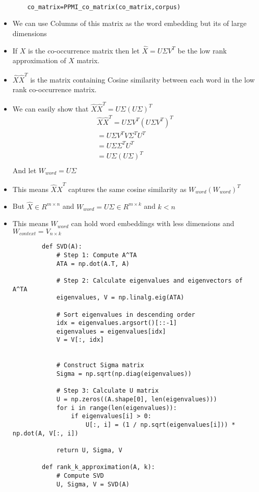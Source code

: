\documentclass{book}
\begin{document}
\begin{itemize}
\begin{verbatim}
	
	co_matrix=PPMI_co_matrix(co_matrix,corpus)
	\end{verbatim}
	\item We can use Columns of this matrix as the word embedding but its of large dimensions
	\item If $X$ is the co-occurrence matrix then let $\hat{X}=U\Sigma V^T$ be the low rank approximation of $X$ matrix.
	\item $\hat{X}\hat{X}^T$ is the matrix containing Cosine similarity between each word in the low rank co-occurrence matrix.
	\item We can easily show that $\hat{X}\hat{X}^T=U\Sigma(U\Sigma)^T$
	\subitem 
	\begin{align}
		\hat{X}\hat{X}^T=U\Sigma V^T(U\Sigma V^T)^T \nonumber\\
		= U\Sigma V^T V\Sigma^T U^T \nonumber\\
		= U\Sigma\Sigma^T U^T \nonumber\\
		= U\Sigma(U\Sigma)^T \nonumber\\
	\end{align}
	And let $W_{word}=U\Sigma$
	\item This means $\hat{X}\hat{X}^T$ captures the same cosine similarity as $W_{word}(W_{word})^T$
	\item But $\hat{X}\in R^{m\times n}$ and $W_{word}=U\Sigma \in R^{m\times k}$ and $k<n$
	\item This means $W_{word}$ can hold word embeddings with less dimensions and $W_{context}=V_{n\times k}$
	\subitem 
	\begin{verbatim}
		def SVD(A):
			# Step 1: Compute A^TA
			ATA = np.dot(A.T, A)
			
			# Step 2: Calculate eigenvalues and eigenvectors of A^TA
			eigenvalues, V = np.linalg.eig(ATA)
			
			# Sort eigenvalues in descending order
			idx = eigenvalues.argsort()[::-1]
			eigenvalues = eigenvalues[idx]
			V = V[:, idx]

			
			# Construct Sigma matrix
			Sigma = np.sqrt(np.diag(eigenvalues))
			
			# Step 3: Calculate U matrix
			U = np.zeros((A.shape[0], len(eigenvalues)))
			for i in range(len(eigenvalues)):
				if eigenvalues[i] > 0:
					U[:, i] = (1 / np.sqrt(eigenvalues[i])) * np.dot(A, V[:, i])
			
			return U, Sigma, V

		def rank_k_approximation(A, k):
			# Compute SVD
			U, Sigma, V = SVD(A)
			

\end{verbatim}
\end{itemize}
\end{document}
